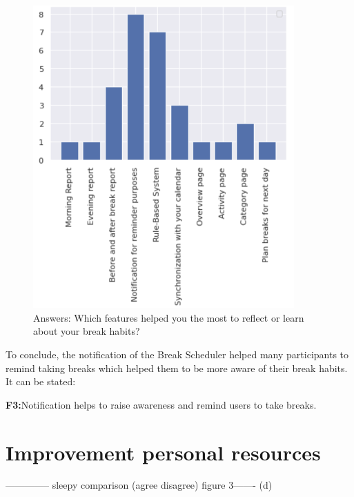 \documentclass{hasel_thesis}
\begin{document}
\begin{figure}[htp]
    \centering
    \includegraphics[width=10cm]{hasel_thesis/images/feature_rating.png}
    \caption{Answers: Which features helped you the most to reflect or learn about your break habits?}
    \label{fig:feature_ratings}
\end{figure}


To conclude, the notification of the Break Scheduler helped many participants to remind taking breaks which helped them to be more aware of their break habits. It can be stated:

\begin{tcolorbox}[colback=white!5!white,colframe=black!75!black]
  \textbf{F3:}Notification helps to raise awareness and remind users to take breaks.
\end{tcolorbox}




\section{Improvement personal resources} \label{resources}

-------------- sleepy comparison (agree disagree) figure 3------- (d)
\end{document}
